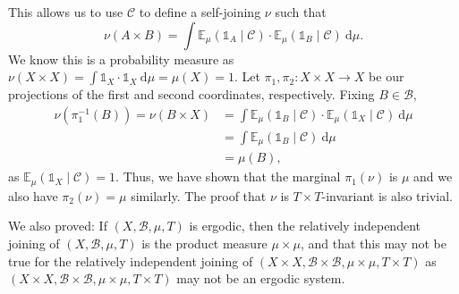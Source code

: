 \documentclass[
  british,
]{article}
\theoremstyle{definition}
\theoremstyle{plain}
\theoremstyle{remark}
\newcommand{\Measure}{{\mu}}
\newcommand{\ProjectionMap}[1][\vphantom{}]{{\pi}_{#1}}
\newcommand{\SigmaAlgebra}[1]{{\mathscr{#1}}}
\newcommand{\Expectation}[1][\Measure]{{\mathbb{E}}_{#1}}
\begin{document}
This allows us to use \(\SigmaAlgebra{C}\) to define a self-joining
\(\nu\) such that
\[\nu(A\times B)=\int\Expectation(\mathbb{1}_A\mid\SigmaAlgebra{C})\cdot\Expectation(\mathbb{1}_B\mid\SigmaAlgebra{C})\ \mathrm{d}\Measure.\]
We know this is a probability measure as
\(\nu(X\times X)=\int\mathbb{1}_X\cdot\mathbb{1}_X\ \mathrm{d}\Measure=\Measure(X)=1\).
Let \(\ProjectionMap[1],\ProjectionMap[2]:X\times X\rightarrow X\) be
our projections of the first and second coordinates, respectively.
Fixing \(B\in\SigmaAlgebra{B}\), \begin{align*}
    \nu(\ProjectionMap[1]^{-1}(B))=\nu(B\times X)
    &=\int\Expectation(\mathbb{1}_B\mid\SigmaAlgebra{C})\cdot\Expectation(\mathbb{1}_X\mid\SigmaAlgebra{C})\ \mathrm{d}\Measure
    \\&=\int\Expectation(\mathbb{1}_B\mid\SigmaAlgebra{C})\ \mathrm{d}\Measure
    \\&=\Measure(B),
\end{align*} as \(\Expectation(\mathbb{1}_X\mid\SigmaAlgebra{C})=1\).
Thus, we have shown that the marginal \(\ProjectionMap[1](\nu)\) is
\(\Measure\) and we also have \(\ProjectionMap[2](\nu)=\Measure\)
similarly. The proof that \(\nu\) is \(T\times T\)-invariant is also
trivial.

We also proved: If \((X,\SigmaAlgebra{B},\Measure,T)\) is ergodic, then
the relatively independent joining of
\((X,\SigmaAlgebra{B},\Measure,T)\) is the product measure
\(\Measure\times\Measure\), and that this may not be true for the
relatively independent joining of
\((X\times X,\SigmaAlgebra{B}\times\SigmaAlgebra{B},\Measure\times\Measure,T\times T)\)
as
\((X\times X,\SigmaAlgebra{B}\times\SigmaAlgebra{B},\Measure\times\Measure,T\times T)\)
may not be an ergodic system.
\end{document}
